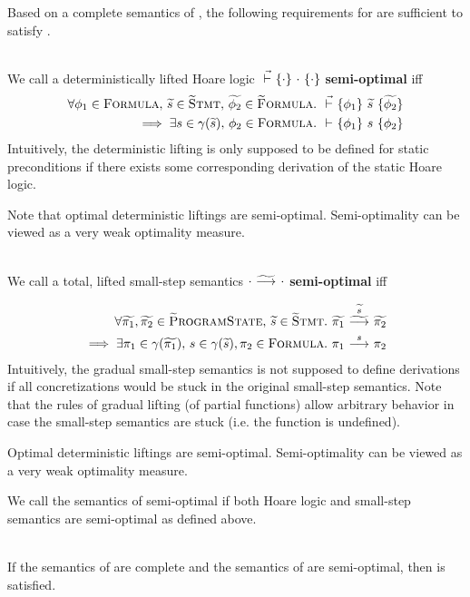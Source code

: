 Based on a complete semantics of \svl, the following requirements for \gvl are sufficient to satisfy .
\begin{definition}~\\
    \label{def:perf-stat}
    We call a deterministically lifted Hoare logic $\dgthoare{}{\cdot}{\cdot}{\cdot}$ \textbf{semi-optimal} iff
    \begin{align*}
    \forall \phi_1 \in \setFormula,\, \grad{s} \in \setGStmt,\, \grad{\phi_2} \in \setGFormula.&~ \dgthoare{}{\phi_1}{\grad{s}}{\grad{\phi_2}}\\ \implies \exists s \in \gamma(\grad{s}),\, \phi_2 \in \setFormula.&~ \thoare{}{\phi_1}{s}{\phi_2}
    \end{align*}
    Intuitively, the deterministic lifting is only supposed to be defined for static preconditions if there exists some corresponding derivation of the static Hoare logic.
    
    Note that optimal deterministic liftings are semi-optimal.
    Semi-optimality can be viewed as a very weak optimality measure.
\end{definition}
\begin{definition}~\\
    \label{def:perf-dyn}
    We call a total, lifted small-step semantics $\gsstep{\cdot}{\cdot}$ \textbf{semi-optimal} iff
    \begin{comment}
    \forall \grad{\pi} \in \setGProgramState.~ (\forall \pi \in \gamma(\grad{\pi}).~ \sstepStuck{\pi}) \implies \gsstep{\grad{\pi}}{\pi_{EX}}
    \end{comment}
    \begin{align*}
    \forall \grad{\pi_1}, \grad{\pi_2} \in \setGProgramState,\, \grad{s} \in \setGStmt.&~ \gsstepConsume{\grad{s}}{\grad{\pi_1}}{\grad{\pi_2}}\\ \implies \exists \pi_1 \in \gamma(\grad{\pi_1}),\, s \in \gamma(\grad{s}), \pi_2 \in \setFormula.&~ \sstepConsume{s}{\pi_1}{\pi_2}
    \end{align*}
    Intuitively, the gradual small-step semantics is not supposed to define derivations if all concretizations would be stuck in the original small-step semantics.
    Note that the rules of gradual lifting (of partial functions) allow arbitrary behavior in case the small-step semantics are stuck (i.e. the function is undefined).
    
    Optimal deterministic liftings are semi-optimal.
    Semi-optimality can be viewed as a very weak optimality measure.
\end{definition}

We call the semantics of \gvl semi-optimal if both Hoare logic and small-step semantics are semi-optimal as defined above.

\begin{theorem}~\\
    \label{thm:compl-and-so-to-gdpres}
    If the semantics of \svl are complete and the semantics of \gvl are semi-optimal, then  is satisfied.
\end{theorem}
